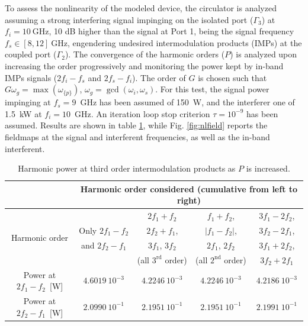 To assess the nonlinearity of the modeled device, the circulator is analyzed assuming a strong interfering signal impinging on the isolated port ($\Gamma_3$) at $f_i = 10~\mathrm{GHz}$, 10 dB higher than the signal at Port 1, being the signal frequency $f_s \in [8,12]~\mathrm{GHz}$, engendering undesired intermodulation products (IMPs) at the coupled port ($\Gamma_2$). The convergence of the harmonic orders ($P$) is analyzed upon increasing the order progressively and monitoring the power kept by in-band IMPs signals ($2f_i-f_s$ and $2f_s-f_i$). The order of $G$ is chosen such that  $G\omega_g = \max(\omega_{\{p\}})$, $\omega_g = \gcd(\omega_i,\omega_s)$. For this test, the signal power impinging at $f_s = 9$~GHz has been assumed of 150~W, and the interferer one of 1.5~kW at $f_i = 10$~GHz. An iteration loop stop criterion $\tau = 10^{-9}$ has been assumed. Results are shown in table \ref{tab:power}, while Fig. \ref{fig:nlfield} reports the fieldmaps at the signal and interferent frequencies, as well as the in-band interferent. 
%
\begin{table}
\begin{center}
\begin{tabular}{|c|c|c|c|c|}
\hline 
& \multicolumn{4}{c|}{Harmonic order considered (cumulative from left to right)} \\ \hline
\multirow{4}{*}{Harmonic order} &  & $2f_1+f_2$ &	$f_1+f_2$, & $3f_1-2f_2$,\\
& Only $2f_1-f_2$ & $2f_2+f_1$, &	$|f_1-f_2|$, & $3f_2-2f_1$,\\
& and $2f_2-f_1$ & $3f_1$, $3f_2$  & $2f_1$, $2f_2$ &  $3f_1+2f_2$,\\
& & (all $3^\mathrm{rd}$ order) & (all $2^\mathrm{nd}$ order) &   $3f_2+2f_1$\\ \hline \hline

Power at $2f_1-f_2$~[W]& $4.6019~10^{-3}$ & $4.2246~10^{-3}$ & $4.2246~10^{-3}$ & $4.2186~10^{-3}$\\ \hline
Power at $2f_2-f_1$~[W]& $2.0990~10^{-1}$ & $2.1951~10^{-1}$ & $2.1951~10^{-1}$ & $2.1991~10^{-1}$\\ \hline
\end{tabular}
\end{center}
\caption{Harmonic power at third order intermodulation products as $P$ is increased.}
\label{tab:power}
\end{table} 
%
\clearpage

